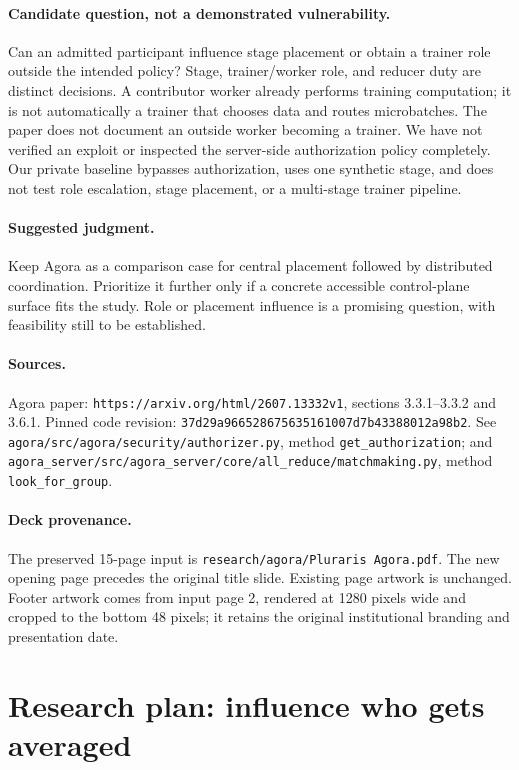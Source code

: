 \paragraph{Candidate question, not a demonstrated vulnerability.}
Can an admitted participant influence stage placement or obtain a trainer role
outside the intended policy? Stage, trainer/worker role, and reducer duty are
distinct decisions. A contributor worker already performs training computation;
it is not automatically a trainer that chooses data and routes microbatches.
The paper does not document an outside worker becoming a trainer. We have not
verified an exploit or inspected the server-side authorization policy completely.
Our private baseline bypasses authorization, uses one synthetic stage, and does
not test role escalation, stage placement, or a multi-stage trainer pipeline.

\paragraph{Suggested judgment.}
Keep Agora as a comparison case for central placement followed by distributed
coordination. Prioritize it further only if a concrete accessible control-plane
surface fits the study. Role or placement influence is a promising question,
with feasibility still to be established.

\paragraph{Sources.}
Agora paper: \texttt{https://arxiv.org/html/2607.13332v1}, sections 3.3.1--3.3.2
and 3.6.1. Pinned code revision: \texttt{37d29a966528675635161007d7b43388012a98b2}.
See \texttt{agora/src/agora/security/authorizer.py}, method
\texttt{get\_authorization}; and
\texttt{agora\_server/src/agora\_server/core/all\_reduce/matchmaking.py},
method \texttt{look\_for\_group}.

\paragraph{Deck provenance.}
The preserved 15-page input is \texttt{research/agora/Pluraris Agora.pdf}.
The new opening page precedes
the original title slide. Existing page artwork is unchanged. Footer artwork
comes from input page 2, rendered at 1280 pixels wide and cropped to the bottom
48 pixels; it retains the original institutional branding and presentation date.

\section*{Research plan: influence who gets averaged}

